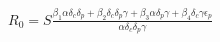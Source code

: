 \documentclass[preview]{standalone}
\begin{document}
\begin{center}
$R_0 = S \frac{\beta_1 \alpha \delta_c \delta_p + \beta_2 \delta_c \delta_p \gamma + \beta_3 \alpha \delta_p \gamma + \beta_4 \delta_c \gamma \epsilon_p}{\alpha \delta_c \delta_p \gamma}$
\end{center}
\end{document}
